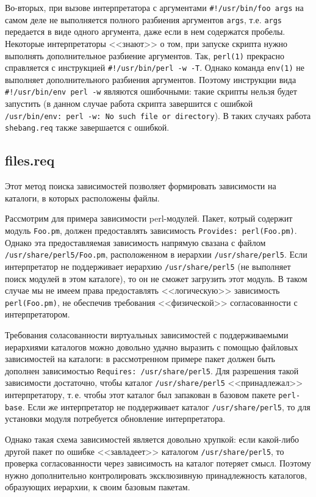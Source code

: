 \documentclass[russian,a4paper,12pt,titlepage]{article}
\begin{document}
Во-вторых, при вызове интерпретатора с аргументами \verb|#!/usr/bin/foo args| на самом деле не выполняется
полного разбиения аргументов \verb|args|, т.е. \verb|args| передается в виде одного аргумента, даже если в нем содержатся
пробелы.  Некоторые интерпретаторы <<знают>> о том, при запуске скрипта нужно выполнять дополнительное разбиение
аргументов.  Так, \verb|perl(1)| прекрасно справляется с инструкцией \verb|#!/usr/bin/perl -w -T|.  Однако
команда \verb|env(1)| не выполняет дополнительного разбиения аргументов.  Поэтому инструкции вида \verb|#!/usr/bin/env perl -w|
являются ошибочными: такие скрипты нельзя будет запустить (в данном случае работа скрипта завершится с ошибкой
\texttt{/usr/bin/env: perl -w: No such file or directory}).  В таких случаях работа \verb|shebang.req|
также завершается с ошибкой.

\subsection{files.req}
\label{files-req}
Этот метод поиска зависимостей позволяет формировать зависимости на каталоги, в которых расположены файлы.

Рассмотрим для примера зависимости perl-модулей.  Пакет, котрый содержит модуль \verb|Foo.pm|,
должен предоставлять зависимость \texttt{Provides: perl(Foo.pm)}.  Однако эта предоставляемая зависимость
напрямую свазана с файлом \texttt{/usr/share/perl5/Foo.pm}, расположенном в иерархии \verb|/usr/share/perl5|.
Если интерпретатор не поддерживает иерархию \verb|/usr/share/perl5| (не выполняет поиск модулей в этом каталоге),
то он не сможет загрузить этот модуль.  В таком случае мы не имеем права предоставлять <<логическую>> зависимость
\verb|perl(Foo.pm)|, не обеспечив требования <<физической>> согласованности с интерпретатором.

Требования соласованности виртуальных зависимостей с поддерживаемыми иерархиями каталогов можно довольно
удачно выразить с помощью файловых зависимостей на каталоги: в рассмотренном примере пакет должен быть
дополнен зависимостью \texttt{Requires: /usr/share/perl5}.  Для разрешения такой зависимости достаточно,
чтобы каталог \verb|/usr/share/perl5| <<принадлежал>> интерпретатору, т.\,е. чтобы этот каталог был
запакован в базовом пакете \verb|perl-base|.  Если же интерпретатор не поддерживает каталог \verb|/usr/share/perl5|,
то для установки модуля потребуется обновление интерпретатора.

Однако такая схема зависимостей является довольно хрупкой: если какой-либо другой пакет по ошибке <<завладеет>>
каталогом \verb|/usr/share/perl5|, то проверка согласованности через зависимость на каталог потеряет смысл.
Поэтому нужно дополнительно контролировать эксклюзивную принадлежность каталогов, образующих иерархии,
к своим базовым пакетам.
\end{document}
